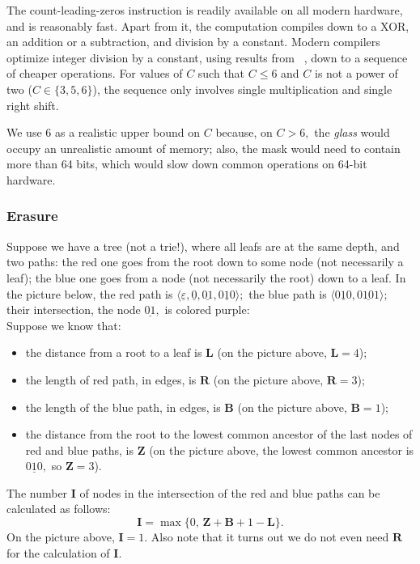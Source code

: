 \documentclass[a4paper,12pt]{article}
\begin{document}
The count-leading-zeros instruction is readily available on all modern hardware, and is reasonably fast.
Apart from it, the computation compiles down to a XOR, an addition or a subtraction, and division by a constant.
Modern compilers optimize integer division by a constant, using results from ~\cite{divcnst}, down to a sequence of cheaper operations.
For values of $C$ such that $C \le 6$ and $C$ is not a power of two ($C \in \{ 3, 5, 6 \}$),
the sequence only involves single multiplication and single right shift.

We use 6 as a realistic upper bound on $C$ because, on $C > 6,$ the \textit{glass} would occupy an unrealistic amount of memory;
also, the mask would need to contain more than 64 bits, which would slow down common operations on 64-bit hardware.

\subsubsection{Erasure}

Suppose we have a tree (not a trie!), where all leafs are at the same depth, and two paths: the red one goes from the root down to some node (not necessarily a leaf);
the blue one goes from a node (not necessarily the root) down to a leaf. In the picture below, the red path is
$\langle \underline{\varepsilon}, \underline{0}, \underline{01}, \underline{010} \rangle;$
the blue path is $\langle \underline{010}, \underline{0101} \rangle;$
their intersection, the node $\underline{01},$ is colored purple:\\


Suppose we know that:
\begin{itemize}
    \item the distance from a root to a leaf is $\mathbf{L}$ (on the picture above, $\mathbf{L} = 4$);
    \item the length of red path, in edges, is $\mathbf{R}$
        (on the picture above, $\mathbf{R} = 3$);
    \item the length of the blue path, in edges, is $\mathbf{B}$
        (on the picture above, $\mathbf{B} = 1$);
    \item the distance from the root to the lowest common ancestor of the last nodes of red and blue paths, is $\mathbf{Z}$
        (on the picture above, the lowest common ancestor is $\underline{010},$ so $\mathbf{Z} = 3$).
\end{itemize}
The number $\mathbf{I}$ of nodes in the intersection of the red and blue paths can be calculated as follows:
$$
\mathbf{I} = \max \{ 0, \, \mathbf{Z} + \mathbf{B} + 1 - \mathbf{L} \}.
$$
On the picture above, $\mathbf{I} = 1.$
Also note that it turns out we do not even need $\mathbf{R}$ for the calculation of $\mathbf{I}.$
\end{document}
